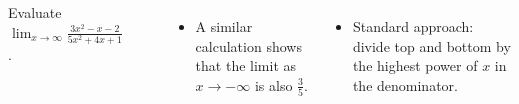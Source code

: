 \begin{frame}
\begin{example}[Example 3, p. 233]
\begin{columns}[c]
Evaluate $\lim_{x\to \infty} \frac{3x^2-x-2}{5x^2+4x+1}$.

\ %
%
%
\begin{itemize}
\item<22->  A similar calculation shows that the limit as $x\to -\infty$ is also $\frac{3}{5}$.
\end{itemize}
\begin{itemize}
\item<2-| alert@2-3>  Standard approach: divide top and bottom by the highest power of $x$ in the denominator.
\end{itemize}

\end{columns}
\end{example}
\end{frame}
